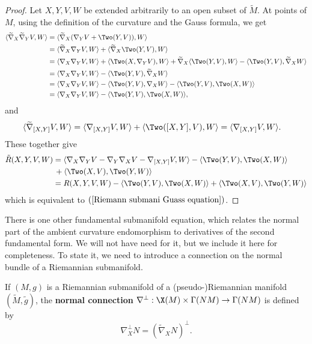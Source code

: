 \begin{proof}
Let $X,Y,V,W$ be extended arbitrarily to an open subset of $\widetilde{M}$. At points of $M$, using the definition of the curvature and the Gauss formula, we get
\begin{align*}
\langle\widetilde{\nabla}_X\widetilde{\nabla}_YV,W\rangle&=\langle\widetilde{\nabla}_X(\nabla_YV+\Two(Y,V)),W\rangle\\
&=\langle\widetilde{\nabla}_X\nabla_YV,W\rangle+\langle\widetilde{\nabla}_X\Two(Y,V),W\rangle\\
&=\langle\nabla_X\nabla_YV,W\rangle+\langle\Two(X,\nabla_YV),W\rangle+\widetilde{\nabla}_X\langle\Two(Y,V),W\rangle-\langle\Two(Y,V),\widetilde{\nabla}_XW\rangle\\
&=\langle\nabla_X\nabla_YV,W\rangle-\langle\Two(Y,V),\widetilde{\nabla}_XW\rangle\\
&=\langle\nabla_X\nabla_YV,W\rangle-\langle\Two(Y,V),\nabla_XW\rangle-\langle\Two(Y,V),\Two(X,W)\rangle\\
&=\langle\nabla_X\nabla_YV,W\rangle-\langle\Two(Y,V),\Two(X,W)\rangle,
\end{align*}
and
\begin{align*}
\langle\widetilde{\nabla}_{[X,Y]}V,W\rangle&=\langle\nabla_{[X,Y]}V,W\rangle+\langle\Two([X,Y],V),W\rangle=\langle\nabla_{[X,Y]}V,W\rangle.
\end{align*}
These together give
\begin{align*}
\tilde{R}(X,Y,V,W)&=\langle\nabla_X\nabla_YV-\nabla_Y\nabla_XV-\nabla_{[X,Y]}V,W\rangle-\langle\Two(Y,V),\Two(X,W)\rangle\\
&\,+\langle\Two(X,V),\Two(Y,W)\rangle\\
&=R(X,Y,V,W)-\langle\Two(Y,V),\Two(X,W)\rangle+\langle\Two(X,V),\Two(Y,W)\rangle
\end{align*}
which is equivalent to $(\ref{Riemann submani Guass equation})$.
\end{proof}
There is one other fundamental submanifold equation, which relates the normal part of the ambient curvature endomorphism to derivatives of the second fundamental form. 
We will not have need for it, but we include it here for completeness. To state it, we need to introduce a connection on the normal bundle of a Riemannian submanifold.\par
If $(M,g)$ is a Riemannian submanifold of a (pseudo-)Riemannian manifold $(\widetilde{M},\tilde{g})$, the \textbf{normal connection} 
$\nabla^{\bot}:\X(M)\times\Gamma(NM)\to\Gamma(NM)$ 
is defined by
\[\nabla^{\bot}_XN=(\widetilde{\nabla}_XN)^{\bot}.\]
